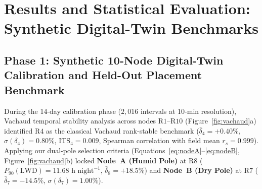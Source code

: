 \documentclass[10pt,twocolumn,a4paper]{article}
\begin{document}
\section{Results and Statistical Evaluation: Synthetic Digital-Twin Benchmarks}

\subsection{Phase 1: Synthetic 10-Node Digital-Twin Calibration and Held-Out Placement Benchmark}

During the 14-day calibration phase ($2,016$ intervals at 10-min resolution), Vachaud temporal stability analysis across nodes $\mathrm{R1}$--$\mathrm{R10}$ (Figure~\ref{fig:vachaud}a) identified $\mathrm{R4}$ as the classical Vachaud rank-stable benchmark ($\bar{\delta}_4 = +0.40\%$, $\sigma(\delta_4) = 0.80\%$, $\mathrm{ITS}_4 = 0.009$, Spearman correlation with field mean $r_s = 0.999$). Applying our dual-pole selection criteria (Equations~\ref{eq:nodeA}--\ref{eq:nodeB}, Figure~\ref{fig:vachaud}b) locked \textbf{Node~A (Humid Pole)} at $\mathrm{R8}$ ($P_{90}(\mathrm{LWD}) = 11.68\text{ h night}^{-1}$, $\bar{\delta}_8 = +18.5\%$) and \textbf{Node~B (Dry Pole)} at $\mathrm{R7}$ ($\bar{\delta}_7 = -14.5\%$, $\sigma(\delta_7) = 1.00\%$).

\begin{table}[t!]
\centering
\caption{Synthetic Digital-Twin Phase 1 Held-Out Spatial Placement Benchmark (Days 15--25, $M_{\text{eval}} = 1,584$ Intervals at 10-Min Resolution)}
\label{tab:phase1}
\end{table}
\end{document}
